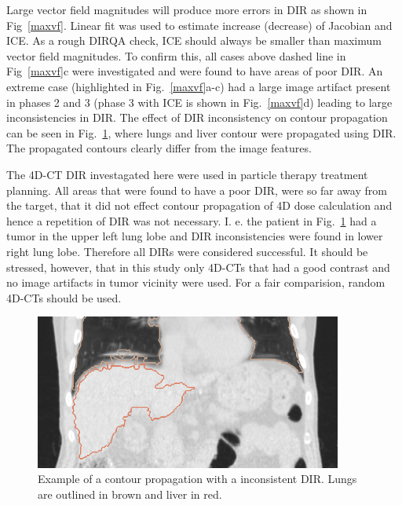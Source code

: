 Large vector field magnitudes will produce more errors in DIR as shown in Fig~\ref{maxvf}. Linear fit was used to estimate increase (decrease) of Jacobian and ICE. 
As a rough DIRQA check, ICE should always be smaller than maximum vector field magnitudes. To confirm this, all cases above dashed line in Fig~\ref{maxvf}c 
were investigated and were found to have areas of poor DIR. An extreme case (highlighted in Fig.~\ref{maxvf}a-c)
had a large image artifact present in phases 2 and 3 (phase 3 with ICE is shown in Fig.~\ref{maxvf}d) leading to large inconsistencies in DIR. 
The effect of DIR inconsistency on contour propagation can be seen in Fig.~\ref{contourPropagation},
where lungs and liver contour were propagated using DIR. The propagated contours clearly differ from the image features.

The 4D-CT DIR investagated here were used in particle therapy treatment planning. All areas that were found to have a poor DIR, were so far away from the target, that it did not effect contour propagation of 4D dose calculation and
hence a repetition of DIR was not necessary.
I. e. the patient in Fig.~\ref{contourPropagation} had a tumor in the upper left lung lobe and DIR inconsistencies were found in lower right lung lobe. 
Therefore all DIRs were considered successful. It should be stressed, however, that in this study only 4D-CTs that had a good contrast and no image artifacts in tumor vicinity were used. For a 
fair comparision, random 4D-CTs should be used.

\begin{figure}[H]
	\begin{center}		
		\includegraphics[width=0.9\textwidth]{./VisualMotionManagment/Images/ContourPropagation/contourPropagation.png}
		\caption{Example of a contour propagation with a inconsistent DIR. Lungs are outlined in brown and liver in red.}
		\label{contourPropagation}
	\end{center}
\end{figure}


